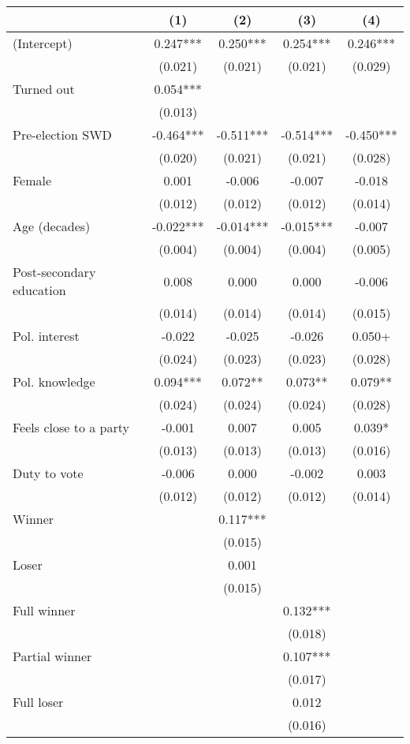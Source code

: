 \begin{table}
\centering
\begin{tabular}[t]{lcccc}
\toprule
  & (1) & (2) & (3) & (4)\\
\midrule
(Intercept) & 0.247*** & 0.250*** & 0.254*** & 0.246***\\
 & (0.021) & (0.021) & (0.021) & (0.029)\\
Turned out & 0.054*** &  &  & \\
 & (0.013) &  &  & \\
Pre-election SWD & -0.464*** & -0.511*** & -0.514*** & -0.450***\\
 & (0.020) & (0.021) & (0.021) & (0.028)\\
Female & 0.001 & -0.006 & -0.007 & -0.018\\
 & (0.012) & (0.012) & (0.012) & \vphantom{1} (0.014)\\
Age (decades) & -0.022*** & -0.014*** & -0.015*** & -0.007\\
 & (0.004) & (0.004) & (0.004) & (0.005)\\
Post-secondary education & 0.008 & 0.000 & 0.000 & -0.006\\
 & (0.014) & (0.014) & (0.014) & (0.015)\\
Pol. interest & -0.022 & -0.025 & -0.026 & 0.050+\\
 & (0.024) & (0.023) & (0.023) & (0.028)\\
Pol. knowledge & 0.094*** & 0.072** & 0.073** & 0.079**\\
 & (0.024) & (0.024) & (0.024) & (0.028)\\
Feels close to a party & -0.001 & 0.007 & 0.005 & 0.039*\\
 & (0.013) & (0.013) & (0.013) & (0.016)\\
Duty to vote & -0.006 & 0.000 & -0.002 & 0.003\\
 & (0.012) & (0.012) & (0.012) & (0.014)\\
Winner &  & 0.117*** &  & \\
 &  & (0.015) &  \vphantom{1} & \\
Loser &  & 0.001 &  & \\
 &  & (0.015) &  & \\
Full winner &  &  & 0.132*** & \\
 &  &  & (0.018) & \\
Partial winner &  &  & 0.107*** & \\
 &  &  & (0.017) & \\
Full loser &  &  & 0.012 & \\
 &  &  & (0.016) & \\

\end{tabular}
\end{table}
